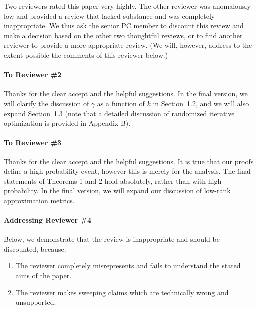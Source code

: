 \documentclass{article}
\begin{document}
Two reviewers rated this paper very highly.
The other reviewer was anomalously low and provided a review that
lacked substance and was completely inappropriate.  
We thus ask the senior PC member to discount this review and make a
decision based on the other two thoughtful reviews, or to find
another reviewer to provide a more appropriate review.
(We will, however, address to the extent possible the comments of this reviewer below.)

\vspace{-3mm}

\paragraph{To Reviewer \#2} Thanks for the clear accept and the
helpful suggestions. In the final version, we will clarify the
discussion of $\gamma$ as a function of $k$ in Section~1.2, and we
will also expand Section~1.3 (note that a detailed discussion of
randomized iterative optimization is provided in Appendix B).

\vspace{-3mm}

\paragraph{To Reviewer \#3} Thanks for the clear accept and the helpful
suggestions. It is true that our proofs define a high probability
event, however this is merely for the analysis. The final
statements of Theorems 1 and 2 hold absolutely, rather than with high
probability. In the final version, we will expand our discussion of
low-rank approximation metrics.

\vspace{-3mm}

\paragraph{Addressing Reviewer \#4}
Below, we demonstrate that the review is inappropriate and should be
discounted, because:\vspace{-2mm}
\begin{enumerate}
\item The reviewer completely misrepresents and fails to understand
  the stated aims of the paper.
  \vspace{-1mm}
\item The reviewer makes sweeping claims which are technically wrong
  and unsupported.
\end{enumerate}\vspace{-2mm}
\end{document}
